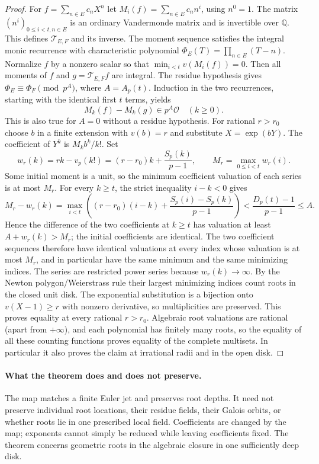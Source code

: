 \begin{proof}
For $f=\sum_{n\in E}c_nX^n$ let
$M_i(f)=\sum_{n\in E}c_nn^i$, using $n^0=1$. The matrix
$(n^i)_{0\le i<t,n\in E}$ is an ordinary Vandermonde matrix and is
invertible over $\mathbb Q$. This defines $\mathcal T_{E,F}$ and its inverse.
The moment sequence satisfies the integral monic recurrence with
characteristic polynomial $\Phi_E(T)=\prod_{n\in E}(T-n)$.
Normalize $f$ by a nonzero scalar so that
$\min_{i<t}v(M_i(f))=0$. Then all moments of $f$ and $g=\mathcal T_{E,F}f$
are integral. The residue hypothesis gives
$\Phi_E\equiv\Phi_F\pmod{p^A}$, where $A=A_p(t)$.
Induction in the two recurrences, starting with the identical first $t$
terms, yields
\[
 M_k(f)-M_k(g)\in p^A\mathcal O\quad(k\ge0).
\]
This is also true for $A=0$ without a residue hypothesis.
For rational $r>r_0$ choose $b$ in a finite extension with $v(b)=r$ and
substitute $X=\exp(bY)$. The coefficient of $Y^k$ is $M_k b^k/k!$.
Set
\[
 w_r(k)=rk-v_p(k!)=(r-r_0)k+\frac{S_p(k)}{p-1},\qquad
 M_r=\max_{0\le i<t}w_r(i).
\]
Some initial moment is a unit, so the minimum coefficient valuation of
each series is at most $M_r$. For every $k\ge t$, the strict inequality
$i-k<0$ gives
\[
 M_r-w_r(k)
 =\max_{i<t}\left((r-r_0)(i-k)+\frac{S_p(i)-S_p(k)}{p-1}\right)
 <\frac{D_p(t)-1}{p-1}\le A.
\]
Hence the difference of the two coefficients at $k\ge t$ has valuation
at least $A+w_r(k)>M_r$; the initial coefficients are identical.
The two coefficient sequences therefore have identical valuations at
every index whose valuation is at most $M_r$, and in particular have
the same minimum and the same minimizing indices.
The series are restricted power series because $w_r(k)\to\infty$.
By the Newton polygon/Weierstrass rule their largest minimizing indices
count roots in the closed unit disk. The exponential substitution is a
bijection onto $v(X-1)\ge r$ with nonzero derivative, so multiplicities
are preserved. This proves equality at every rational $r>r_0$.
Algebraic root valuations are rational (apart from $+\infty$), and each
polynomial has finitely many roots, so the equality of all these counting
functions proves equality of the complete multisets. In particular it
also proves the claim at irrational radii and in the open disk.\end{proof}

\paragraph{What the theorem does and does not preserve.}
The map matches a finite Euler jet and preserves root depths. It need
not preserve individual root locations, their residue fields, their
Galois orbits, or whether roots lie in one prescribed local field.
Coefficients are changed by the map; exponents cannot simply be reduced
while leaving coefficients fixed. The theorem concerns geometric roots
in the algebraic closure in one sufficiently deep disk.

